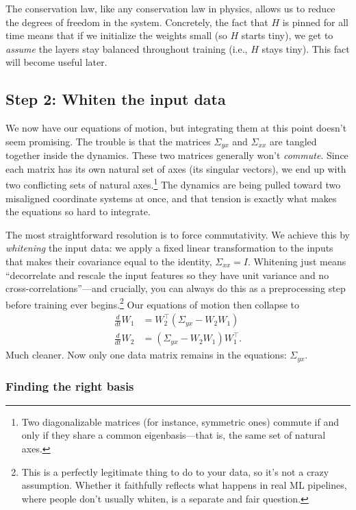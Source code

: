 The conservation law, like any conservation law in physics, allows us to reduce the degrees of freedom in the system. Concretely, the fact that $H$ is pinned for all time means that if we initialize the weights small (so $H$ starts tiny), we get to \emph{assume} the layers stay
balanced throughout training (i.e., $H$ stays tiny). This fact will become useful later. 

\subsection{Step 2: Whiten the input data}

We now have our equations of motion, but integrating them at this point doesn't seem promising. The trouble is that the matrices $\Sigma_{yx}$ and $\Sigma_{xx}$ are tangled together inside the dynamics. These two matrices generally won't \emph{commute}. Since each matrix has its own natural set of axes (its singular
vectors), we end up with two conflicting sets of natural axes.\footnote{Two diagonalizable matrices (for instance, symmetric ones) commute if and only if they share a common eigenbasis---that is,
the same set of natural axes.} The dynamics are being pulled toward two misaligned
coordinate systems at once, and that tension is exactly what makes the equations
so hard to integrate.

The most straightforward resolution is to force commutativity. We achieve this by \emph{whitening} the input data: we apply a fixed linear
transformation to the inputs that makes their covariance equal to the identity,
$\Sigma_{xx} = I$. Whitening just means ``decorrelate and rescale the input
features so they have unit variance and no cross-correlations''---and crucially,
you can always do this as a preprocessing step before training ever
begins.\footnote{This is a perfectly legitimate thing to do to your data, so it's
not a crazy assumption. Whether it faithfully reflects what happens in real ML
pipelines, where people don't usually whiten, is a separate and fair question.} Our equations of motion then collapse to
\begin{align}
    \frac{d}{dt}W_1 &= W_2^\top(\Sigma_{yx} - W_2 W_1) \label{eq:W1-whitened}\\
    \frac{d}{dt}W_2 &= (\Sigma_{yx} - W_2 W_1) W_1^\top\label{eq:W2-whitened}.
\end{align}
Much cleaner. Now only one data matrix remains in the equations: $\Sigma_{yx}$.

\subsubsection*{Finding the right basis}

